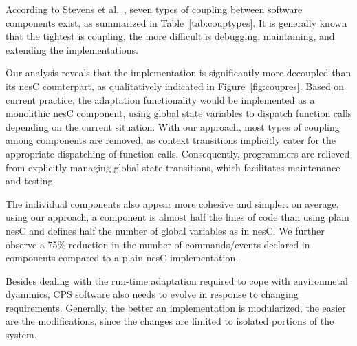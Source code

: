  According to Stevens et
al.~\cite{}, seven types of coupling between software components
exist, as summarized in Table~\ref{tab:couptypes}. It is generally
known that the tightest is coupling, the more difficult is debugging,
maintaining, and extending the implementations.

Our analysis reveals that the \conesc implementation is significantly
more decoupled than its nesC counterpart, as qualitatively indicated
in Figure~\ref{fig:coupres}. Based on current practice, the adaptation
functionality would be implemented as a monolithic nesC component,
using global state variables to dispatch function calls depending on
the current situation. With our approach, most types of coupling among
components are removed, as context transitions implicitly cater for
the appropriate dispatching of function calls. Consequently,
programmers are relieved from explicitly managing global state
transitions, which facilitates maintenance and testing.

The individual \conesc components also appear more
cohesive and simpler: on average, using our approach, a component is
almost half the lines of code than using plain nesC and defines half
the number of global variables as in nesC. We further observe a 75\%
reduction in the number of commands/events declared in \conesc
components compared to a plain nesC implementation.



 Besides dealing with the run-time
adaptation required to cope with environmetal dyammics, CPS software
also needs to evolve in response to changing requirements. Generally,
the better an implementation is modularized, the easier are the
modifications, since the changes are limited to isolated portions of
the system.


